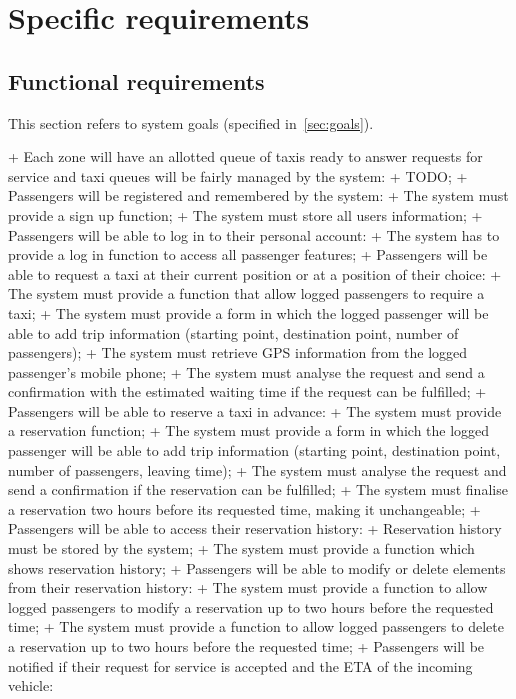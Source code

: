 \chapter{Specific requirements}

\section{Functional requirements}
This section refers to system goals (specified in~\autoref{sec:goals}).

+ Each zone will have an allotted queue of taxis ready to answer requests for service and taxi queues will be fairly managed by the system:
	+ TODO;
+ Passengers will be registered and remembered by the system:
	+ The system must provide a sign up function;
	+ The system must store all users information; 
+ Passengers will be able to log in to their personal account:
	+ The system has to provide a log in function to access all passenger features;
+ Passengers will be able to request a taxi at their current position or at a position of their choice:
	+ The system must provide a function that allow logged passengers to require a taxi;
	+ The system must provide a form in which the logged passenger will be able to add trip information (starting point, destination point, number of passengers);
	+ The system must retrieve GPS information from the logged passenger’s mobile phone;
	+ The system must analyse the request and send a confirmation with the estimated waiting time if the request can be fulfilled;
+ Passengers will be able to reserve a taxi in advance:
	+ The system must provide a reservation function;
	+ The system must provide a form in which the logged passenger will be able to add trip information (starting point, destination point, number of passengers, leaving time);
	+ The system must analyse the request and send a confirmation if the reservation can be fulfilled;
	+ The system must finalise a reservation two hours before its requested time, making it unchangeable;
+ Passengers will be able to access their reservation history:
	+ Reservation history must be stored by the system;
	+ The system must provide a function which shows reservation history;
+ Passengers will be able to modify or delete elements from their reservation history:
	+ The system must provide a function to allow logged passengers to modify a reservation up to two hours before the requested time;
	+ The system must provide a function to allow logged passengers to delete a reservation up to two hours before the requested time;
+ Passengers will be notified if their request for service is accepted and the ETA of the incoming vehicle:
